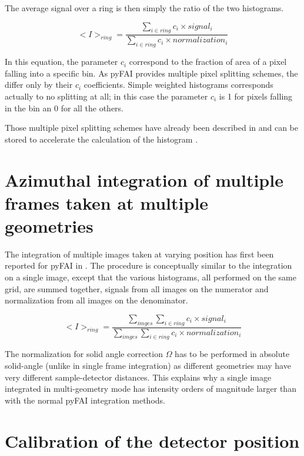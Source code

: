 \documentclass[preprint]{iucr}              %
\begin{document}
The average signal over a ring is then simply the ratio of the two histograms.

$$
<I>_{ring} = \frac{\sum\limits_{i \in ring} c_i \times signal_i}
                  {\sum\limits_{i \in ring} c_i \times normalization_i} 
$$

In this equation, the parameter $c_i$ correspond to the fraction of area of a
pixel falling into a specific bin. 
As pyFAI provides multiple pixel splitting schemes, the differ only by their
$c_i$ coefficients. 
Simple weighted histograms corresponds actually to no splitting at all; in this
case the parameter $c_i$ is 1 for pixels falling in the bin an 0 for all the
others.
  
Those multiple pixel splitting schemes have already been described in
 \cite{fv5028} and can be stored to accelerate the calculation of the
histogram  \cite{kieffer_ashiotis-proc-euroscipy-2014}.

\section{Azimuthal integration of multiple frames taken at multiple geometries}

The integration of multiple images taken at varying position has first been
reported for pyFAI in  \cite{PyFAI_PDJ}. 
The procedure is conceptually similar to the integration on a single image,
except that the various histograms, all performed on the same grid, are summed
together, signals from all images on the numerator and normalization from all
images on the denominator.

$$
<I>_{ring} = \frac{\sum\limits_{imges} \sum\limits_{i \in ring} c_i \times
signal_i} {\sum\limits_{imges} \sum\limits_{i \in ring} c_i \times
normalization_i} 
$$

The normalization for solid angle correction $\Omega$ has to be performed in
absolute solid-angle (unlike in single frame integration) as different
geometries may have very different sample-detector distances. 
This explains why a single image integrated in multi-geometry mode  has
intensity orders of magnitude larger than with the normal pyFAI integration
methods.

\section{Calibration of the detector position}
\end{document}
